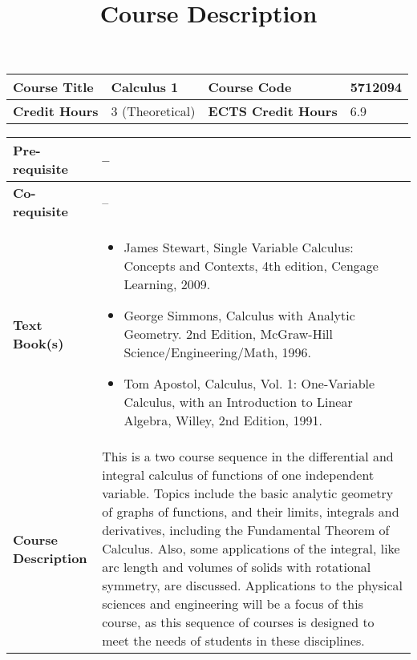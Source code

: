 \documentclass[12pt]{article}
\title{Course Description}
\begin{document}
\maketitle






\begin{minipage}{\textwidth}
\begin{tabularx}{\textwidth}{|l|X|l|X|}
\hline
\textbf{Course Title}       &  Calculus 1 & \textbf{Course Code}       &  5712094 \\ \hline
\textbf{Credit Hours}       &  3 (Theoretical) & \textbf{ECTS Credit Hours}       &  6.9 \\ \hline
\end{tabularx}

\begin{tabularx}{\textwidth}{|l|X|}
\hline
\textbf{Pre-requisite}      &  -- \\ \hline
\textbf{Co-requisite}       &  -- \\ \hline
\textbf{Text Book(s)}      & \begin{minipage}{.70\textwidth}
					\begin{itemize} \itemsep-0.4em
						\vspace{3mm}
						\item James Stewart, Single Variable Calculus: Concepts and Contexts, 4th edition, Cengage Learning, 2009.
						\item George Simmons, Calculus with Analytic Geometry. 2nd Edition, McGraw-Hill Science/Engineering/Math, 1996.
						\item Tom Apostol, Calculus, Vol. 1: One-Variable Calculus, with an Introduction to Linear Algebra, Willey, 2nd Edition, 1991.
						\vspace{3mm}
					\end{itemize}
				\end{minipage}  \\ \hline
\textbf{Course Description} & \begin{minipage}{.70\textwidth}
					\vspace{3mm}
					
					This is a two course sequence in the differential and integral calculus of functions of one independent variable. Topics include the basic analytic geometry of graphs of functions, and their limits, integrals and derivatives, including the Fundamental Theorem of Calculus. Also, some applications of the integral, like arc length and volumes of solids with rotational symmetry, are discussed. Applications to the physical sciences and engineering will be a focus of this course, as this sequence of courses is designed to meet the needs of students in these disciplines.
					\newline
					

\end{minipage}
\end{tabularx}
\end{minipage}
\end{document}
